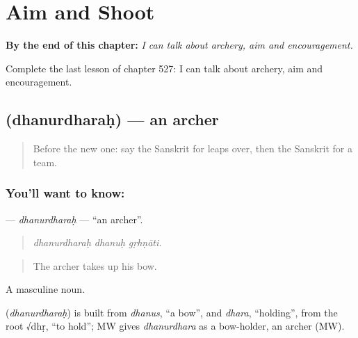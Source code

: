 
\chapter{Aim and Shoot}
\label{ch:sa-aim-and-shoot}

\begin{chapteropening}
\textbf{By the end of this chapter:} \emph{I can talk about archery, aim and encouragement.}

Complete the last lesson of chapter 527: I can talk about archery, aim and encouragement.
\end{chapteropening}

\section[\texorpdfstring{\sk{धनुर्धरः} (dhanurdharaḥ)}{धनुर्धरः (dhanurdharaḥ)}]{ (dhanurdharaḥ) — an archer}

\label{lesson:SA-C527-dhanurdharah}



\begin{quote}
Before the new one: say the Sanskrit for leaps over, then the Sanskrit for a team.
\end{quote}

\subsection*{You'll want to know: }
\textbf{} — \emph{dhanurdharaḥ} — \textquotedblleft{}an archer\textquotedblright{}.

\begin{quote}
  
\end{quote}

\begin{quote}
\emph{dhanurdharaḥ dhanuḥ gṛhṇāti.}
\end{quote}

\begin{quote}
The archer takes up his bow.
\end{quote}

A masculine noun.

\begin{cousinweb}
\textbf{} (\emph{dhanurdharaḥ}) is built from \emph{dhanus}, \textquotedblleft{}a bow\textquotedblright{}, and \emph{dhara}, \textquotedblleft{}holding\textquotedblright{}, from the root √dhṛ, \textquotedblleft{}to hold\textquotedblright{}; MW gives \emph{dhanurdhara} as a bow-holder, an archer (MW).
\end{cousinweb}

